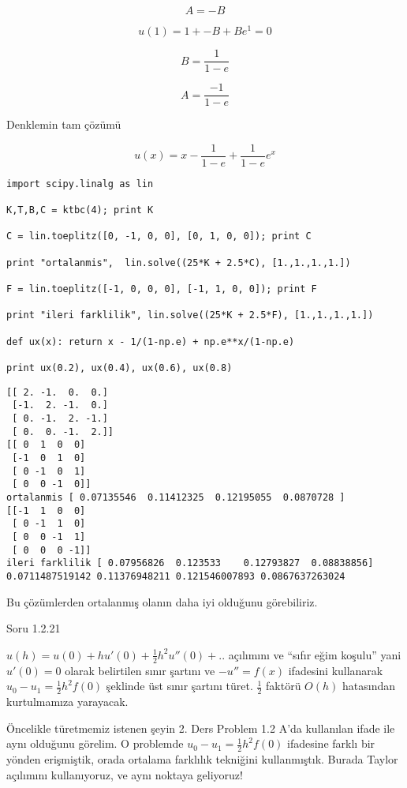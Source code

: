 \documentclass[12pt,fleqn]{article}\usepackage{../../common}
\begin{document}
$$ A = -B $$

$$ u(1) = 1 + -B + Be^1 = 0$$

$$ B = \frac{1}{1-e} $$

$$ A = \frac{-1}{1-e} $$

Denklemin tam çözümü

$$ u(x) = x - \frac{1}{1-e} + \frac{1}{1-e}e^x $$

\begin{verbatim}
import scipy.linalg as lin

K,T,B,C = ktbc(4); print K

C = lin.toeplitz([0, -1, 0, 0], [0, 1, 0, 0]); print C

print "ortalanmis",  lin.solve((25*K + 2.5*C), [1.,1.,1.,1.])

F = lin.toeplitz([-1, 0, 0, 0], [-1, 1, 0, 0]); print F

print "ileri farklilik", lin.solve((25*K + 2.5*F), [1.,1.,1.,1.])

def ux(x): return x - 1/(1-np.e) + np.e**x/(1-np.e)

print ux(0.2), ux(0.4), ux(0.6), ux(0.8)
\end{verbatim}

\begin{verbatim}
[[ 2. -1.  0.  0.]
 [-1.  2. -1.  0.]
 [ 0. -1.  2. -1.]
 [ 0.  0. -1.  2.]]
[[ 0  1  0  0]
 [-1  0  1  0]
 [ 0 -1  0  1]
 [ 0  0 -1  0]]
ortalanmis [ 0.07135546  0.11412325  0.12195055  0.0870728 ]
[[-1  1  0  0]
 [ 0 -1  1  0]
 [ 0  0 -1  1]
 [ 0  0  0 -1]]
ileri farklilik [ 0.07956826  0.123533    0.12793827  0.08838856]
0.0711487519142 0.11376948211 0.121546007893 0.0867637263024
\end{verbatim}

Bu çözümlerden ortalanmış olanın daha iyi olduğunu görebiliriz. 

Soru 1.2.21

$u(h) = u(0) + hu'(0) + \frac{1}{2}h^2u''(0)+..$ açılımını ve ``sıfır eğim
koşulu'' yani $u'(0) = 0$ olarak belirtilen sınır şartını ve $-u'' = f(x)$
ifadesini kullanarak $u_0 - u_1 = \frac{1}{2}h^2f(0)$ şeklinde üst sınır
şartını türet. $\frac{1}{2}$ faktörü $O(h)$ hatasından kurtulmamıza
yarayacak. 

Öncelikle türetmemiz istenen şeyin 2. Ders Problem 1.2 A'da kullanılan
ifade ile aynı olduğunu görelim. O problemde $u_0 - u_1 =  \frac{1}{2}h^2f(0)$ 
ifadesine farklı bir yönden erişmiştik, orada ortalama farklılık tekniğini 
kullanmıştık. Burada Taylor açılımını kullanıyoruz, ve aynı noktaya geliyoruz! 
\end{document}
